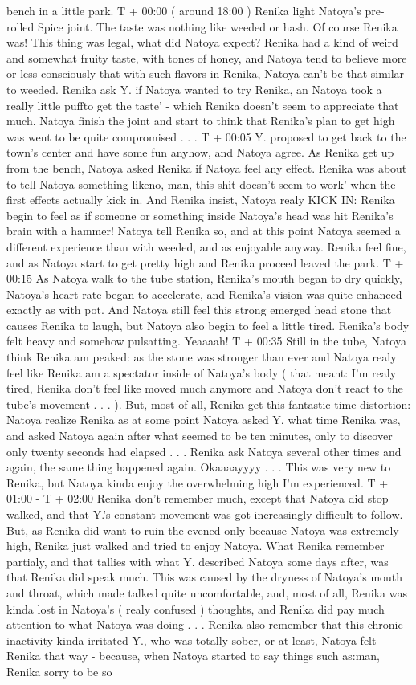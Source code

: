 \documentclass[12pt]{book}
\begin{document}
bench in a little park. T + 00:00 ( around 18:00 ) Renika light Natoya's pre-rolled Spice joint. The taste was nothing like weeded or hash. Of course Renika was! This thing was legal, what did Natoya expect? Renika had a kind of weird and somewhat fruity taste, with tones of honey, and Natoya tend to believe more or less consciously that with such flavors in Renika, Natoya can't be that similar to weeded. Renika ask Y. if Natoya wanted to try Renika, an Natoya took a really little puffto get the taste' - which Renika doesn't seem to appreciate that much. Natoya finish the joint and start to think that Renika's plan to get high was went to be quite compromised . . .  T + 00:05 Y. proposed to get back to the town's center and have some fun anyhow, and Natoya agree. As Renika get up from the bench, Natoya asked Renika if Natoya feel any effect. Renika was about to tell Natoya something likeno, man, this shit doesn't seem to work' when the first effects actually kick in. And Renika insist, Natoya realy KICK IN: Renika begin to feel as if someone or something inside Natoya's head was hit Renika's brain with a hammer! Natoya tell Renika so, and at this point Natoya seemed a different experience than with weeded, and as enjoyable anyway. Renika feel fine, and as Natoya start to get pretty high and Renika proceed leaved the park. T + 00:15 As Natoya walk to the tube station, Renika's mouth began to dry quickly, Natoya's heart rate began to accelerate, and Renika's vision was quite enhanced - exactly as with pot. And Natoya still feel this strong emerged head stone that causes Renika to laugh, but Natoya also begin to feel a little tired. Renika's body felt heavy and somehow pulsatting. Yeaaaah! T + 00:35 Still in the tube, Natoya think Renika am peaked: as the stone was stronger than ever and Natoya realy feel like Renika am a spectator inside of Natoya's body ( that meant: I'm realy tired, Renika don't feel like moved much anymore and Natoya don't react to the tube's movement . . .  ). But, most of all, Renika get this fantastic time distortion: Natoya realize Renika as at some point Natoya asked Y. what time Renika was, and asked Natoya again after what seemed to be ten minutes, only to discover only twenty seconds had elapsed . . .  Renika ask Natoya several other times and again, the same thing happened again. Okaaaayyyy . . .  This was very new to Renika, but Natoya kinda enjoy the overwhelming high I'm experienced. T + 01:00 - T + 02:00 Renika don't remember much, except that Natoya did stop walked, and that Y.'s constant movement was got increasingly difficult to follow. But, as Renika did want to ruin the evened only because Natoya was extremely high, Renika just walked and tried to enjoy Natoya. What Renika remember partialy, and that tallies with what Y. described Natoya some days after, was that Renika did speak much. This was caused by the dryness of Natoya's mouth and throat, which made talked quite uncomfortable, and, most of all, Renika was kinda lost in Natoya's ( realy confused ) thoughts, and Renika did pay much attention to what Natoya was doing . . .  Renika also remember that this chronic inactivity kinda irritated Y., who was totally sober, or at least, Natoya felt Renika that way - because, when Natoya started to say things such as:man, Renika sorry to be so 
\end{document}
